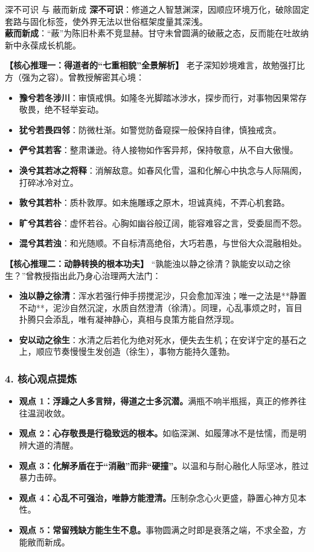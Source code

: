 \begin{ConceptBox}{深不可识 与 蔽而新成}
\textbf{深不可识}：修道之人智慧渊深，因顺应环境万化，破除固定套路与固化标签，使外界无法以世俗框架度量其深浅。\\
\textbf{蔽而新成}：“蔽”为陈旧朴素不竞显赫。甘守未曾圆满的破蔽之态，反而能在吐故纳新中永葆成长机能。
\end{ConceptBox}

\noindent\textbf{【核心推理一：得道者的“七重相貌”全景解析】}
老子深知妙境难言，故勉强打比方（强为之容）。曾教授解密其心境：
\begin{itemize}
    \item \textbf{豫兮若冬涉川}：审慎戒惧。如隆冬光脚踏冰涉水，探步而行，对事物因果常存敬畏，绝不轻举妄动。
    \item \textbf{犹兮若畏四邻}：防微杜渐。如警觉防备窥探一般保持自律，慎独戒贪。
    \item \textbf{俨兮其若客}：整肃谦逊。待人接物如作客异邦，保持敬意，从不自大傲慢。
    \item \textbf{涣兮其若冰之将释}：消解敌意。如春风化雪，温和化解心中执念与人际隔阂，打碎冰冷对立。
    \item \textbf{敦兮其若朴}：质朴敦厚。如未施雕琢之原木，坦诚真纯，不弄心机套路。
    \item \textbf{旷兮其若谷}：虚怀若谷。心胸如幽谷般辽阔，能容难容之言，受委屈而不怨。
    \item \textbf{混兮其若浊}：和光随顺。不自标清高绝俗，大巧若愚，与世俗大众混融相处。
\end{itemize}

\noindent\textbf{【核心推理二：动静转换的根本功夫】}
“孰能浊以静之徐清？孰能安以动之徐生？”曾教授指出此乃身心治理两大法门：
\begin{itemize}
    \item \textbf{浊以静之徐清}：浑水若强行伸手捞搅泥沙，只会愈加浑浊；唯一之法是**静置不动**，泥沙自然沉淀，水质自然澄清（徐清）。同理，心乱事烦之时，盲目扑腾只会添乱，唯有凝神静心，真相与良策方能自然浮现。
    \item \textbf{安以动之徐生}：水清之后若化为绝对死水，便失去生机；在安详宁定的基石之上，顺应节奏慢慢生发创造（徐生），事物方能持久蓬勃。
\end{itemize}

\subsubsection{4. 核心观点提炼}
\begin{itemize}
    \item \textbf{观点 1：浮躁之人多言辩，得道之士多沉潜。}满瓶不响半瓶摇，真正的修养往往温润收敛。
    \item \textbf{观点 2：心存敬畏是行稳致远的根本。}如临深渊、如履薄冰不是怯懦，而是明辨大道的清醒。
    \item \textbf{观点 3：化解矛盾在于“消融”而非“硬撞”。}以温和与耐心融化人际坚冰，胜过暴力击碎。
    \item \textbf{观点 4：心乱不可强治，唯静方能澄清。}压制杂念心火更盛，静置心神方见本性。
    \item \textbf{观点 5：常留残缺方能生生不息。}事物圆满之时即是衰落之端，不求全盈，方能敝而新成。
\end{itemize}

